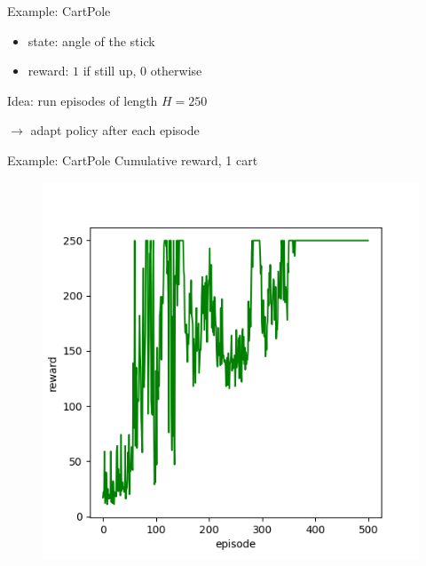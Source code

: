 \documentclass[12pt,aspectratio=169]{beamer}
\begin{document}
\begin{frame}{Example: CartPole}
\begin{minipage}[t]{0.5\linewidth}
    \begin{itemize}
    \item state: angle of the stick
    \item reward: $1$ if still up, $0$ otherwise
    \end{itemize}

    \vspace{1em}

    Idea: run episodes of length $H = 250$

    $\rightarrow$ adapt policy after each episode

  \end{minipage}
  
\end{frame}

\begin{frame}{Example: CartPole}
  Cumulative reward, 1 cart

  \vspace{-1em}
  
  \begin{figure}
    \centering
    \includegraphics[width=0.35\linewidth]{images/CartPole1.png}

    \label{fig:enter-label}
  \end{figure}

\end{frame}
\end{document}
